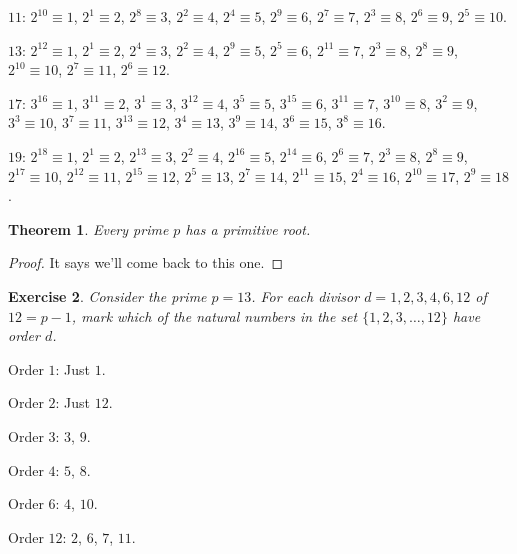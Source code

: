 \documentclass{article}
\newtheorem{thm}{Theorem}[section]
\newtheorem{ex}[thm]{Exercise}
\numberwithin{equation}{thm}
\begin{document}
$11$: $2^{10} \equiv 1$, $2^1 \equiv 2$, $2^8 \equiv 3$, $2^2 \equiv 4$, $2^4 \equiv 5$, $2^9 \equiv 6$, $2^7 \equiv 7$, $2^3 \equiv 8$,
$2^6 \equiv 9$, $2^5 \equiv 10$.

$13$: $2^{12} \equiv 1$, $2^1 \equiv 2$, $2^4 \equiv 3$, $2^2 \equiv 4$, $2^9 \equiv 5$, $2^5 \equiv 6$, $2^{11} \equiv 7$, $2^3 \equiv 8$,
$2^8 \equiv 9$, $2^{10} \equiv 10$, $2^7 \equiv 11$, $2^6 \equiv 12$.

$17$: $3^{16} \equiv 1$, $3^{11} \equiv 2$, $3^1 \equiv 3$, $3^{12} \equiv 4$, $3^5 \equiv 5$, $3^{15} \equiv 6$, $3^{11} \equiv 7$, $3^{10} \equiv 8$,
$3^2 \equiv 9$, $3^3 \equiv 10$, $3^7 \equiv 11$, $3^{13} \equiv 12$, $3^4 \equiv 13$, $3^9 \equiv 14$, $3^6 \equiv 15$, $3^8 \equiv 16$.

$19$: $2^{18} \equiv 1$, $2^1 \equiv 2$, $2^{13} \equiv 3$, $2^2 \equiv 4$, $2^{16} \equiv 5$, $2^{14} \equiv 6$, $2^6 \equiv 7$, $2^3 \equiv 8$,
$2^8 \equiv 9$, $2^{17} \equiv 10$, $2^{12} \equiv 11$, $2^{15} \equiv 12$, $2^5 \equiv 13$, $2^7 \equiv 14$, $2^{11} \equiv 15$, $2^4 \equiv 16$,
$2^{10} \equiv 17$, $2^9 \equiv 18$.



\begin{thm} \label{6.8}
  Every prime $p$ has a primitive root.
\end{thm}

\begin{proof}
  It says we'll come back to this one.
\end{proof}



\begin{ex} \label{6.9}
  Consider the prime $p = 13$. For each divisor $d = 1, 2, 3, 4, 6, 12$ of $12 = p-1$, mark which of the natural numbers in the set $\{1, 2, 3, \ldots, 12\}$ have order $d$.
\end{ex}

Order $1$: Just $1$.

Order $2$: Just $12$.

Order $3$: $3$, $9$.

Order $4$: $5$, $8$.

Order $6$: $4$, $10$.

Order $12$: $2$, $6$, $7$, $11$.
\end{document}
